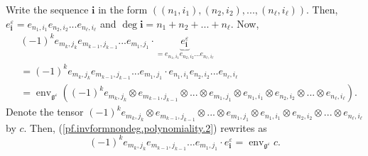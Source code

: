 \documentclass
[numbers=enddot,12pt,final,onecolumn,german,notitlepage]{scrartcl}%
\theoremstyle{definition}
\begin{document}
Write the sequence $\mathbf{i}$ in the form $\left(  \left(  n_{1}%
,i_{1}\right)  ,\left(  n_{2},i_{2}\right)  ,...,\left(  n_{\ell},i_{\ell
}\right)  \right)  $. Then, $e_{\mathbf{i}}^{\varepsilon}=e_{n_{1},i_{1}%
}e_{n_{2},i_{2}}...e_{n_{\ell},i_{\ell}}$ and $\deg\mathbf{i}=n_{1}%
+n_{2}+...+n_{\ell}$. Now,%
\begin{align}
&  \left(  -1\right)  ^{k}e_{m_{k},j_{k}}e_{m_{k-1},j_{k-1}}...e_{m_{1},j_{1}%
}\cdot\underbrace{e_{\mathbf{i}}^{\varepsilon}}_{=e_{n_{1},i_{1}}%
e_{n_{2},i_{2}}...e_{n_{\ell},i_{\ell}}}\nonumber\\
&  =\left(  -1\right)  ^{k}e_{m_{k},j_{k}}e_{m_{k-1},j_{k-1}}...e_{m_{1}%
,j_{1}}\cdot e_{n_{1},i_{1}}e_{n_{2},i_{2}}...e_{n_{\ell},i_{\ell}}\nonumber\\
&  =\operatorname*{env}\nolimits_{\mathfrak{g}^{\varepsilon}}\left(  \left(
-1\right)  ^{k}e_{m_{k},j_{k}}\otimes e_{m_{k-1},j_{k-1}}\otimes...\otimes
e_{m_{1},j_{1}}\otimes e_{n_{1},i_{1}}\otimes e_{n_{2},i_{2}}\otimes...\otimes
e_{n_{\ell},i_{\ell}}\right)  . \label{pf.invformnondeg.polynomiality.2}%
\end{align}
Denote the tensor $\left(  -1\right)  ^{k}e_{m_{k},j_{k}}\otimes
e_{m_{k-1},j_{k-1}}\otimes...\otimes e_{m_{1},j_{1}}\otimes e_{n_{1},i_{1}%
}\otimes e_{n_{2},i_{2}}\otimes...\otimes e_{n_{\ell},i_{\ell}}$ by $c$. Then,
(\ref{pf.invformnondeg.polynomiality.2}) rewrites as%
\begin{equation}
\left(  -1\right)  ^{k}e_{m_{k},j_{k}}e_{m_{k-1},j_{k-1}}...e_{m_{1},j_{1}%
}\cdot e_{\mathbf{i}}^{\varepsilon}=\operatorname*{env}\nolimits_{\mathfrak{g}%
^{\varepsilon}}c. \label{pf.invformnondeg.polynomiality.3}%
\end{equation}
\end{document}
